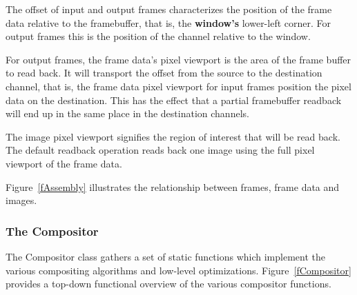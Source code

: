 \documentclass[10pt,a4]{scrartcl}
\newcommand{\fig}[1]{Figure~\ref{#1}}
\begin{document}
The offset of input and output frames characterizes the position of the
frame data relative to the framebuffer, that is, the \textbf{window's}
lower-left corner. For output frames this is the position of the channel
relative to the window.

For output frames, the frame data's pixel viewport is the area of the
frame buffer to read back. It will transport the offset from the source
to the destination channel, that is, the frame data pixel viewport for
input frames position the pixel data on the destination. This has the
effect that a partial framebuffer readback will end up in the same place
in the destination channels.

The image pixel viewport signifies the region of interest that will be read
back. The default readback operation reads back one image using the full
pixel viewport of the frame data.

\fig{fAssembly} illustrates the relationship between frames, frame data
and images.

\subsubsection{\label{sCompositor}The Compositor}

The \textsf{Compositor} class gathers a set of static functions which
implement the various compositing algorithms and low-level
optimizations. \fig{fCompositor} provides a top-down functional overview
of the various compositor functions.
\end{document}

